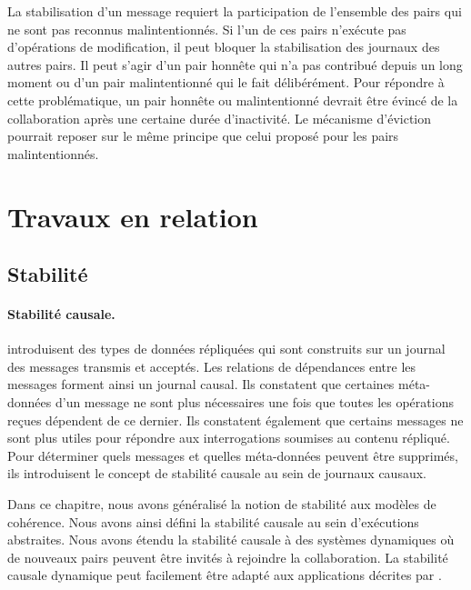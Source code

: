 La stabilisation d'un message requiert la participation de l'ensemble des pairs qui ne sont pas reconnus malintentionnés.
Si l'un de ces pairs n'exécute pas d'opérations de modification, il peut bloquer la stabilisation des journaux des autres pairs.
Il peut s'agir d'un pair honnête qui n'a pas contribué depuis un long moment ou d'un pair malintentionné qui le fait délibérément.
Pour répondre à cette problématique, un pair honnête ou malintentionné devrait être évincé de la collaboration après une certaine durée d'inactivité.
Le mécanisme d'éviction pourrait reposer sur le même principe que celui proposé pour les pairs malintentionnés.


\section{Travaux en relation}

\subsection{Stabilité}

\paragraph{Stabilité causale.} \textcite{baquero_2018_pure-op-crdt, baquero_2014_pure-op-crdt} introduisent des types de données répliquées qui sont construits sur un journal des messages transmis et acceptés.
Les relations de dépendances entre les messages forment ainsi un journal causal.
Ils constatent que certaines méta-données d'un message ne sont plus nécessaires une fois que toutes les opérations reçues dépendent de ce dernier.
Ils constatent également que certains messages ne sont plus utiles pour répondre aux interrogations soumises au contenu répliqué.
Pour déterminer quels messages et quelles méta-données peuvent être supprimés, ils introduisent le concept de stabilité causale au sein de journaux causaux.

Dans ce chapitre, nous avons généralisé la notion de stabilité aux modèles de cohérence.
Nous avons ainsi défini la stabilité causale au sein d'exécutions abstraites.
Nous avons étendu la stabilité causale à des systèmes dynamiques où de nouveaux pairs peuvent être invités à rejoindre la collaboration.
La stabilité causale dynamique peut facilement être adapté aux applications décrites par \textcite{baquero_2018_pure-op-crdt}.

